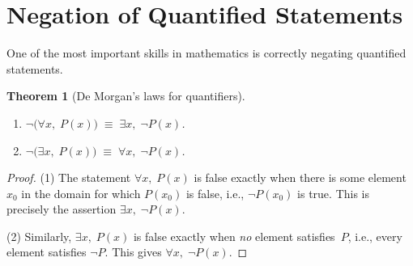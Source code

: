 \documentclass[12pt,a4paper,openany]{book}
\theoremstyle{definition}
\theoremstyle{plain}
\newtheorem{theorem}[definition]{Theorem}
\theoremstyle{remark}
\begin{document}
\section{Negation of Quantified Statements}
\label{sec:negation-quantifiers}

One of the most important skills in mathematics is correctly negating quantified
statements.

\begin{theorem}[De Morgan's laws for quantifiers]
\label{thm:demorgan-quantifiers}
\begin{enumerate}[nosep]
  \item $\lnot\bigl(\forall x,\; P(x)\bigr) \;\equiv\; \exists x,\; \lnot P(x)$.
  \item $\lnot\bigl(\exists x,\; P(x)\bigr) \;\equiv\; \forall x,\; \lnot P(x)$.
\end{enumerate}
\end{theorem}

\begin{proof}
(1) The statement $\forall x,\; P(x)$ is false exactly when there is some element
$x_0$ in the domain for which $P(x_0)$ is false, i.e., $\lnot P(x_0)$ is true.
This is precisely the assertion $\exists x,\; \lnot P(x)$.

\medskip\noindent
(2) Similarly, $\exists x,\; P(x)$ is false exactly when \emph{no} element
satisfies~$P$, i.e., every element satisfies $\lnot P$. This gives
$\forall x,\; \lnot P(x)$.
\end{proof}
\end{document}
